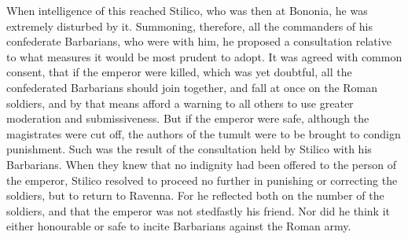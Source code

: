 When intelligence of this reached Stilico, who was then at Bononia, he was extremely disturbed by it. Summoning, therefore, all the commanders of his confederate Barbarians, who were with him, he proposed a consultation relative to what measures it would be most prudent to adopt. It was agreed with common consent, that if the emperor were killed, which was yet doubtful, all the confederated Barbarians should join together, and fall at once on the Roman soldiers, and by that means afford a warning to all others to use greater moderation and submissiveness. But if the emperor were safe, although the magistrates were cut off, the authors of the tumult were to be brought to condign punishment. Such was the result of the consultation held by Stilico with his Barbarians. When they knew that no indignity had been offered to the person of the emperor, Stilico resolved to proceed no further in punishing or correcting the soldiers, but to return to Ravenna. For he reflected both on the number of the soldiers, and that the emperor was not stedfastly his friend. Nor did he think it either honourable or safe to incite Barbarians against the Roman army.

